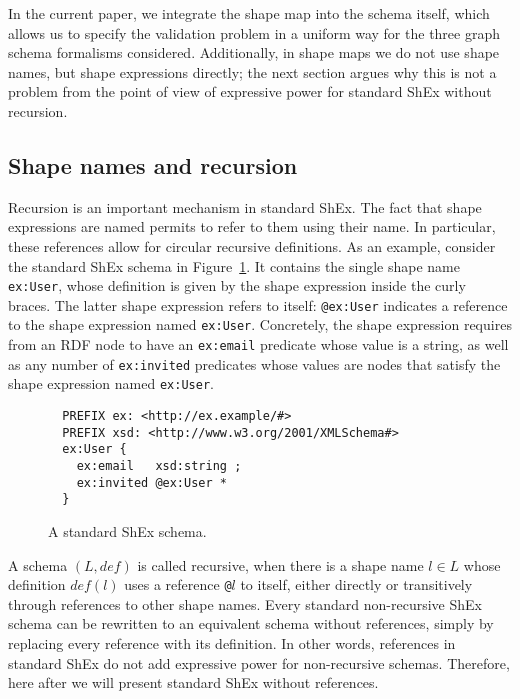 In the current paper, we integrate the shape map into the schema itself, which
allows us to specify the validation problem in a uniform way for the three graph
schema formalisms considered.
Additionally, in shape maps we do not use shape names, but shape expressions
directly; the next section argues why this is not a problem from the point of
view of expressive power for standard ShEx without recursion.


\subsection{Shape names and recursion}
\label{app:sec-shex-recursion}

Recursion is an important mechanism in standard ShEx.
The fact that shape expressions are named permits to refer to
them using their name.
In particular, these references allow for circular recursive definitions.
As an example, consider the standard ShEx schema in
Figure~\ref{fig:app-shex-schema-example}.
It contains the single shape name \texttt{ex:User}, whose definition is given by
the shape expression inside the curly braces.
The latter shape expression refers to itself: \texttt{@ex:User} indicates a
reference to the shape expression named \texttt{ex:User}.
Concretely, the shape expression requires from an RDF node to have an
\texttt{ex:email} predicate whose value is a string, as well as any number of
\texttt{ex:invited} predicates whose values are nodes that satisfy the shape
expression named \texttt{ex:User}.

\begin{figure}[h]
\centering
{\small
\begin{verbatim}
  PREFIX ex: <http://ex.example/#>
  PREFIX xsd: <http://www.w3.org/2001/XMLSchema#>
  ex:User {
    ex:email   xsd:string ;
    ex:invited @ex:User *
  }
\end{verbatim}}
\vspace{-2em}
\caption{\label{fig:app-shex-schema-example}%
  A standard ShEx schema.}
\end{figure}

A \stshex schema $(L, \mathit{def})$ is called recursive, when there is a shape
name $l \in L$ whose definition $\mathit{def}(l)$ uses a reference \texttt{@}$l$
to itself, either directly or transitively through references to other shape
names.
Every standard non-recursive ShEx schema can be rewritten to an equivalent
schema without references, simply by replacing every reference with its
definition.
In other words, references in standard ShEx do not add expressive power for
non-recursive schemas.
Therefore, here after we will present standard ShEx without references.


